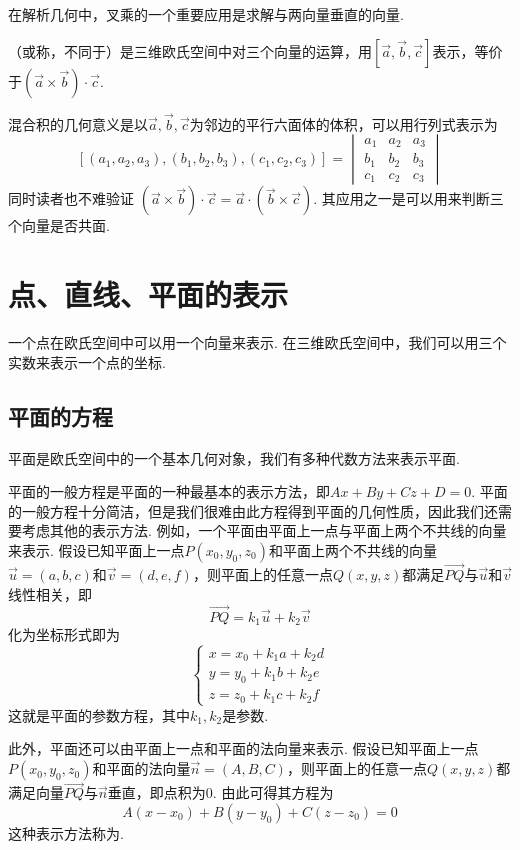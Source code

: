 在解析几何中，叉乘的一个重要应用是求解与两向量垂直的向量.
\begin{definition}[混合积]  
    （或称，不同于）是三维欧氏空间中对三个向量的运算，用$[\vec{a},\vec{b},\vec{c}]$表示，等价于$(\vec{a}\times\vec{b})\cdot\vec{c}$.
\end{definition}
混合积的几何意义是以$\vec{a},\vec{b},\vec{c}$为邻边的平行六面体的体积，可以用行列式表示为
\[[(a_1,a_2,a_3),(b_1,b_2,b_3),(c_1,c_2,c_3)]=\begin{vmatrix}
        a_1 & a_2 & a_3 \\
        b_1 & b_2 & b_3 \\
        c_1 & c_2 & c_3
    \end{vmatrix}\]
同时读者也不难验证 $ (\vec{a}\times\vec{b})\cdot\vec{c} = \vec{a}\cdot(\vec{b}\times\vec{c}) $. 其应用之一是可以用来判断三个向量是否共面.

\section{点、直线、平面的表示}

一个点在欧氏空间中可以用一个向量来表示. 在三维欧氏空间中，我们可以用三个实数来表示一个点的坐标.

\subsection{平面的方程}

平面是欧氏空间中的一个基本几何对象，我们有多种代数方法来表示平面.

平面的一般方程是平面的一种最基本的表示方法，即$Ax+By+Cz+D=0$. 平面的一般方程十分简洁，但是我们很难由此方程得到平面的几何性质，因此我们还需要考虑其他的表示方法. 例如，一个平面由平面上一点与平面上两个不共线的向量来表示. 假设已知平面上一点$P(x_0,y_0,z_0)$和平面上两个不共线的向量$\vec{u}=(a,b,c)$和$\vec{v}=(d,e,f)$，则平面上的任意一点$Q(x,y,z)$都满足$\overrightarrow{PQ}$与$\vec{u}$和$\vec{v}$线性相关，即
\[\overrightarrow{PQ}=k_1\vec{u}+k_2\vec{v}\]
化为坐标形式即为
\[\begin{cases}
        x=x_0+k_1a+k_2d \\
        y=y_0+k_1b+k_2e \\
        z=z_0+k_1c+k_2f
    \end{cases}\]
这就是平面的参数方程，其中$k_1,k_2$是参数.

此外，平面还可以由平面上一点和平面的法向量来表示. 假设已知平面上一点$P(x_0,y_0,z_0)$和平面的法向量$\vec{n}=(A,B,C)$，则平面上的任意一点$Q(x,y,z)$都满足向量$\overrightarrow{PQ}$与$\vec{n}$垂直，即点积为0. 由此可得其方程为\[A(x-x_0)+B(y-y_0)+C(z-z_0)=0\]这种表示方法称为.

